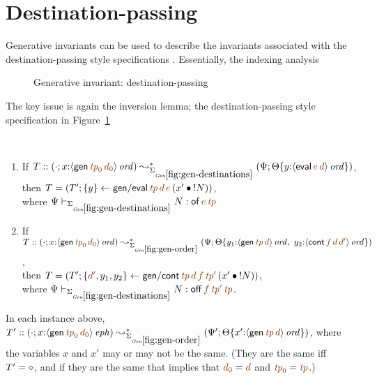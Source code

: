 \section{Destination-passing}
\label{sec:gen-destinations}

Generative invariants can be used to describe the invariants 
associated with the destination-passing style specifications . Essentially,
the indexing analysis 

\begin{figure}[tp]
\caption{Generative invariant: destination-passing}
\label{fig:gen-destinations} 
\end{figure}

The key issue is again the inversion lemma; the destination-passing
style specification in Figure~\ref{fig:gen-destinations}

\bigskip
\begin{lemma}~
\label{lemma:inversion-destinations}
\begin{enumerate}
\item If 
   $T :: (\cdot; x{:}\istrue{\susp{{\sf gen}\,\lf{{\it tp}_0}\,\lf{d_0}}})
         \leadsto^*_{\siggendests}
         (\Psi; \tackon{\Theta}
            {y{:}\istrue{\susp{{\sf eval}\,\lf{e}\,\lf{d}}}})$,
\\ then 
   $T = \left(T'; \trstep{y}{{\sf gen/eval}\,\lf{\it tp}\,\lf{d}\,\lf{e}\,
                                  (\tfuser{x'}{\tbangr{N}})}\right)$,
\\ where
   $\Psi \vdash_{\siggendests} N : {{\sf of}\,\lf{e}\,\lf{\it tp}}$ 
\medskip
\item If 
   $T :: (\cdot; x{:}\istrue{\susp{{\sf gen}\,\lf{{\it tp}_0}\,\lf{d_0}}})
         \leadsto^*_{\siggenorder}
         (\Psi; \tackon{\Theta}
            {y_1{:}\istrue{\susp{{\sf gen}\,\lf{{\it tp}}\,\lf{d}}}, ~
             y_2{:}\istrue{\susp{{\sf cont}\,\lf{f}\,\lf{d}\,\lf{d'}}}})$,
\\ then 
   $T = \left(T'; \trstep{\lf{d'},y_1,y_2}
              {{\sf gen/cont}\,\lf{\it tp}\,\lf{d}\,\lf{f}\,\lf{{\it tp}'}\,
                (\tfuser{x'}{\tbangr{N}})}\right)$,
\\ where 
   $\Psi \vdash_{\siggendests} N : 
       {{{\sf off}\,\lf{f}\,\lf{{\it tp}'}\,\lf{{\it tp}}}}$.
\medskip
\end{enumerate}
In each instance above, 
$T' :: (\cdot; x{:}\iseph{\susp{{\sf gen}\,\lf{{\it tp}_0}\,\lf{d_0}}})
       \leadsto^*_{\siggenorder}
       (\Psi'; \tackon{\Theta}
          {x'{:}\istrue{\susp{{\sf gen}\,\lf{\it tp}\,\lf{d}}}})$,
%
where the variables $x$ and $x'$ may or may not
be the same. (They are the same iff $T' = \diamond$, and if they
are the same that implies that 
$\lf{d_0} = \lf{d}$ and $\lf{{\it tp}_0} = \lf{\it tp}$.)
\end{lemma}

